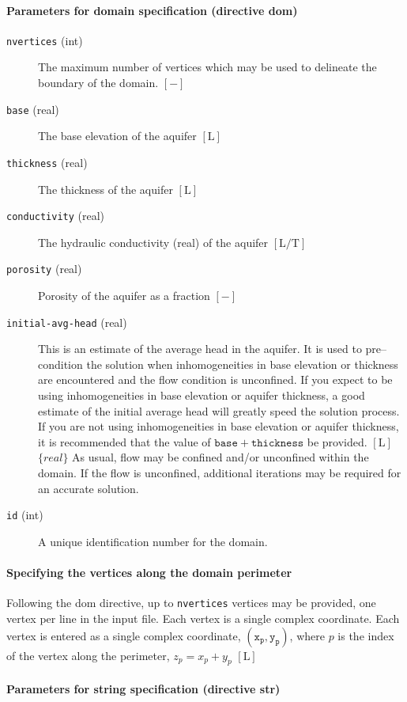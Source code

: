 \paragraph{Parameters for domain specification (directive \textsf{dom})}
\begin{description}
\item [{\texttt{nvertices}} (int)] The maximum number of vertices which may be used to delineate the boundary of the domain. $[-]$
\item [{\texttt{base}} (real)] The base elevation of the aquifer $[\mathrm{L}]$
\item [{\texttt{thickness}} (real)] The thickness of the aquifer $[\mathrm{L}]$
\item [{\texttt{conductivity}} (real)] The hydraulic conductivity (real) of the aquifer $[\mathrm{L/T}]$
\item [{\texttt{porosity}} (real)] Porosity of the aquifer as a fraction $[-]$
\item [{\texttt{initial-avg-head}} (real)] This is an estimate of the average head in the aquifer. It is used to pre--condition the solution when inhomogeneities in base elevation or thickness are encountered and the flow condition is unconfined. If you expect to be using inhomogeneities in base elevation or aquifer thickness, a good estimate of the initial average head will greatly speed the solution process. If you are not using inhomogeneities in base elevation or aquifer thickness, it is recommended that the value of $\mathtt{base+thickness}$ be provided. $[\mathrm{L}]$
$\{real\}$
As usual, flow may be confined and/or unconfined within the domain. If the flow is unconfined, additional iterations may be required for an accurate solution.
\item [{\texttt{id}} (int)] A unique identification number for the domain.
\end{description}

\paragraph{Specifying the vertices along the domain perimeter}
Following the \textsf{dom} directive, up to \texttt{nvertices} vertices may be provided, one vertex per line in the input file. Each vertex is a single complex coordinate. Each vertex is entered as a single complex coordinate, $\mathtt{(x_p, y_p)}$, where $p$ is the index of the vertex along the perimeter, $z_{p}=x_{p}+y_{p}$ $[\mathrm{L}]$


\paragraph{Parameters for string specification (directive \textsf{\textmd{str}})}

